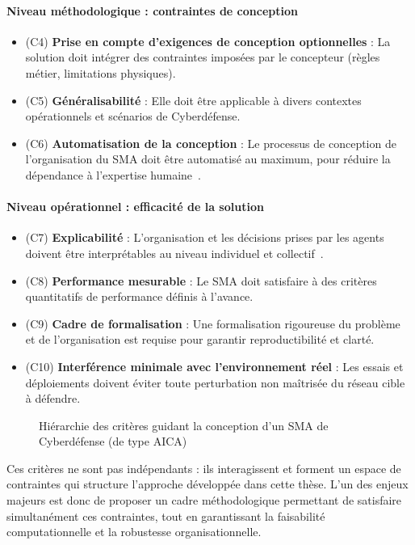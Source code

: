 \paragraph{Niveau méthodologique : contraintes de conception}
\begin{itemize}
    \item (C4) \textbf{Prise en compte d'exigences de conception optionnelles} : La solution doit intégrer des contraintes imposées par le concepteur (règles métier, limitations physiques).
    \item (C5) \textbf{Généralisabilité} : Elle doit être applicable à divers contextes opérationnels et scénarios de Cyberdéfense.
    \item (C6) \textbf{Automatisation de la conception} : Le processus de conception de l'organisation du \ac{SMA} doit être automatisé au maximum, pour réduire la dépendance à l'expertise humaine~\cite{Dennis2010}.
\end{itemize}

\paragraph{Niveau opérationnel : efficacité de la solution}
\begin{itemize}
    \item (C7) \textbf{Explicabilité} : L'organisation et les décisions prises par les agents doivent être interprétables au niveau individuel et collectif~\cite{Boella2006}.
    \item (C8) \textbf{Performance mesurable} : Le \ac{SMA} doit satisfaire à des critères quantitatifs de performance définis à l'avance.
    \item (C9) \textbf{Cadre de formalisation} : Une formalisation rigoureuse du problème et de l'organisation est requise pour garantir reproductibilité et clarté.
    \item (C10) \textbf{Interférence minimale avec l'environnement réel} : Les essais et déploiements doivent éviter toute perturbation non maîtrisée du réseau cible à défendre.
\end{itemize}

\begin{figure}[h]
    \centering
    \resizebox{\textwidth}{!}{%
        
    }
    \caption{Hiérarchie des critères guidant la conception d'un SMA de Cyberdéfense (de type AICA)}
    \label{fig:criteria}
\end{figure}

Ces critères ne sont pas indépendants : ils interagissent et forment un espace de contraintes qui structure l'approche développée dans cette thèse. L'un des enjeux majeurs est donc de proposer un cadre méthodologique permettant de satisfaire simultanément ces contraintes, tout en garantissant la faisabilité computationnelle et la robustesse organisationnelle.


